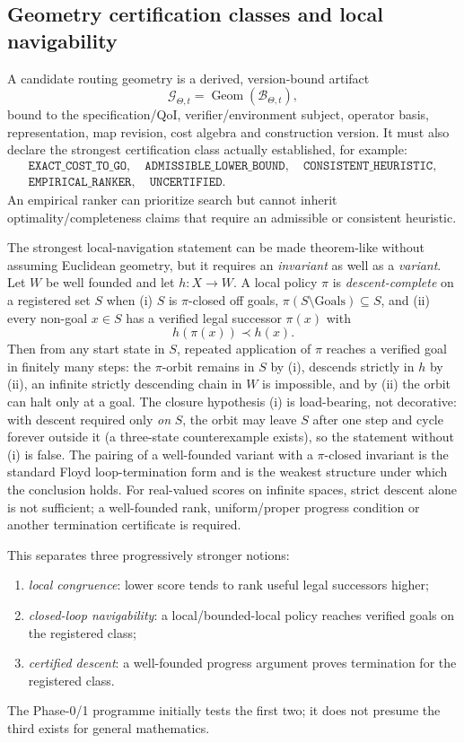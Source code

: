\subsection{Geometry certification classes and local navigability}
A candidate routing geometry is a derived, version-bound artifact
\[
\mathcal G_{\Theta,t}=\operatorname{Geom}(\mathcal B_{\Theta,t}),
\]
bound to the specification/QoI, verifier/environment subject, operator basis, representation, map revision, cost algebra and construction version. It must also declare the strongest certification class actually established, for example:
\[
\begin{gathered}
\texttt{EXACT\_COST\_TO\_GO},\quad
\texttt{ADMISSIBLE\_LOWER\_BOUND},\quad
\texttt{CONSISTENT\_HEURISTIC},\\
\texttt{EMPIRICAL\_RANKER},\quad
\texttt{UNCERTIFIED}.
\end{gathered}
\]
An empirical ranker can prioritize search but cannot inherit optimality/completeness claims that require an admissible or consistent heuristic.

The strongest local-navigation statement can be made theorem-like without assuming Euclidean geometry, but it requires an \emph{invariant} as well as a \emph{variant}. Let $W$ be well founded and let $h:X\to W$. A local policy $\pi$ is \emph{descent-complete} on a registered set $S$ when (i) $S$ is $\pi$-closed off goals, $\pi(S\setminus\mathrm{Goals})\subseteq S$, and (ii) every non-goal $x\in S$ has a verified legal successor $\pi(x)$ with
\[
h(\pi(x))\prec h(x).
\]
Then from any start state in $S$, repeated application of $\pi$ reaches a verified goal in finitely many steps: the $\pi$-orbit remains in $S$ by (i), descends strictly in $h$ by (ii), an infinite strictly descending chain in $W$ is impossible, and by (ii) the orbit can halt only at a goal. The closure hypothesis (i) is load-bearing, not decorative: with descent required only \emph{on} $S$, the orbit may leave $S$ after one step and cycle forever outside it (a three-state counterexample exists), so the statement without (i) is false. The pairing of a well-founded variant with a $\pi$-closed invariant is the standard Floyd loop-termination form and is the weakest structure under which the conclusion holds. For real-valued scores on infinite spaces, strict descent alone is not sufficient; a well-founded rank, uniform/proper progress condition or another termination certificate is required.

This separates three progressively stronger notions:
\begin{enumerate}
    \item \emph{local congruence}: lower score tends to rank useful legal successors higher;
    \item \emph{closed-loop navigability}: a local/bounded-local policy reaches verified goals on the registered class;
    \item \emph{certified descent}: a well-founded progress argument proves termination for the registered class.
\end{enumerate}
The Phase-0/1 programme initially tests the first two; it does not presume the third exists for general mathematics.

